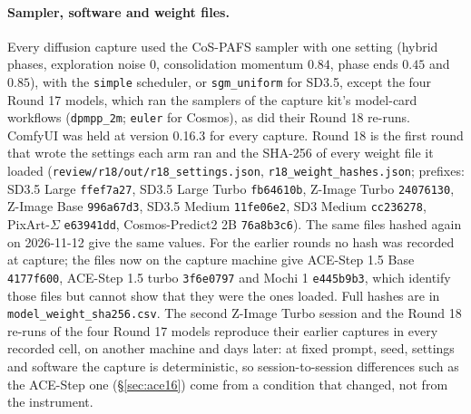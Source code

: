 \documentclass[11pt]{article}
\begin{document}
\paragraph{Sampler, software and weight files.} Every diffusion capture used the CoS-PAFS sampler with one setting (hybrid phases, exploration noise $0$, consolidation momentum $0.84$, phase ends $0.45$ and $0.85$), with the \texttt{simple} scheduler, or \texttt{sgm\_uniform} for SD3.5, except the four Round 17 models, which ran the samplers of the capture kit's model-card workflows (\texttt{dpmpp\_2m}; \texttt{euler} for Cosmos), as did their Round 18 re-runs. ComfyUI was held at version 0.16.3 for every capture. Round 18 is the first round that wrote the settings each arm ran and the SHA-256 of every weight file it loaded (\texttt{review/r18/out/r18\_settings.json}, \texttt{r18\_weight\_hashes.json}; prefixes: SD3.5 Large \texttt{ffef7a27}, SD3.5 Large Turbo \texttt{fb64610b}, Z-Image Turbo \texttt{24076130}, Z-Image Base \texttt{996a67d3}, SD3.5 Medium \texttt{11fe06e2}, SD3 Medium \texttt{cc236278}, PixArt-$\Sigma$ \texttt{e63941dd}, Cosmos-Predict2 2B \texttt{76a8b3c6}). The same files hashed again on 2026-11-12 give the same values. For the earlier rounds no hash was recorded at capture; the files now on the capture machine give ACE-Step 1.5 Base \texttt{4177f600}, ACE-Step 1.5 turbo \texttt{3f6e0797} and Mochi 1 \texttt{e445b9b3}, which identify those files but cannot show that they were the ones loaded. Full hashes are in \texttt{model\_weight\_sha256.csv}. The second Z-Image Turbo session and the Round 18 re-runs of the four Round 17 models reproduce their earlier captures in every recorded cell, on another machine and days later: at fixed prompt, seed, settings and software the capture is deterministic, so session-to-session differences such as the ACE-Step one (\S\ref{sec:ace16}) come from a condition that changed, not from the instrument.
\end{document}
